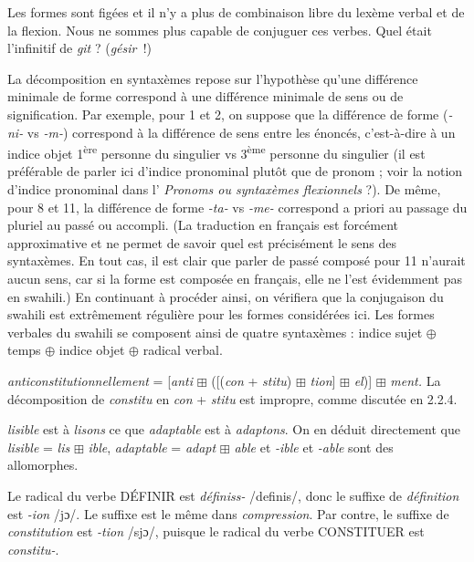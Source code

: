 {     Les formes sont figées et il n’y a plus de combinaison libre du lexème verbal et de la flexion. Nous ne sommes plus capable de conjuguer ces verbes. Quel était l’infinitif de \textit{git} ? (\textit{gésir~}!)

     La décomposition en syntaxèmes repose sur l’hypothèse qu’une différence minimale de forme correspond à une différence minimale de sens ou de signification. Par exemple, pour 1 et 2, on suppose que la différence de forme (\textit{{}-ni-} vs \textit{{}-m-}) correspond à la différence de sens entre les énoncés, c’est-à-dire à un indice objet 1\textsuperscript{ère} personne du singulier vs 3\textsuperscript{ème} personne du singulier (il est préférable de parler ici d’indice pronominal plutôt que de pronom ; voir la notion d’indice pronominal dans l’ \textit{Pronoms ou syntaxèmes flexionnels} ?). De même, pour 8 et 11, la différence de forme \textit{{}-ta-} vs \textit{{}-me-} correspond a priori au passage du pluriel au passé ou accompli. (La traduction en français est forcément approximative et ne permet de savoir quel est précisément le sens des syntaxèmes. En tout cas, il est clair que parler de passé composé pour 11 n’aurait aucun sens, car si la forme est composée en français, elle ne l’est évidemment pas en swahili.) En continuant à procéder ainsi, on vérifiera que la conjugaison du swahili est extrêmement régulière pour les formes considérées ici. Les formes verbales du swahili se composent ainsi de quatre syntaxèmes : indice sujet \textrm{${\oplus}$} temps \textrm{${\oplus}$} indice objet \textrm{${\oplus}$} radical verbal.

     \textit{anticonstitutionnellement} = [\textit{anti} \textrm{${\boxplus}$} ([(\textit{con} + \textit{stitu}) \textrm{${\boxplus}$} \textit{tion}] \textrm{${\boxplus}$} \textit{el})] \textrm{${\boxplus}$} \textit{ment.} La décomposition de \textit{constitu} en \textit{con} + \textit{stitu} est impropre, comme discutée en 2.2.4.

     \textit{lisible} est à \textit{lisons} ce que \textit{adaptable} est à \textit{adaptons}. On en déduit directement que \textit{lisible} = \textit{lis} \textrm{${\boxplus}$} \textit{ible}, \textit{adaptable} = \textit{adapt} \textrm{${\boxplus}$} \textit{able} et \textit{{}-ible} et \textit{{}-able} sont des allomorphes.

     Le radical du verbe DÉFINIR est \textit{définiss-} /definis/, donc le suffixe de \textit{définition} est \textit{{}-ion} /jɔ/. Le suffixe est le même dans \textit{compression}. Par contre, le suffixe de \textit{constitution} est \textit{{}-tion} /sjɔ/, puisque le radical du verbe CONSTITUER est \textit{constitu-}.

}
